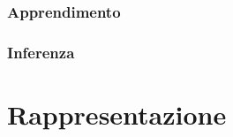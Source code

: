\subsubsection{Apprendimento}

\subsubsection{Inferenza}

\subsection{\mprocess{}}
\label{sec:mps}

\begin{definizione}
\end{definizione} 

\begin{definizione}[\upcase\omprocess{}]
\end{definizione} 

\begin{definizione}
\end{definizione} 

\begin{definizione}[\upcase\cmprocess{}]
\end{definizione} 

\begin{definizione}
\end{definizione} 

\section{Rappresentazione}
\label{sec:rappresentazione}

